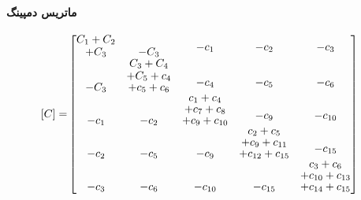 \paragraph{ماتریس دمپینگ}
\begin{equation}\label{Eq.damping_matrix_dimensional_combined}
\begin{aligned}
[C] =& 
\begin{bmatrix}
\shortstack{$C_1 + C_2$ \\ $+ C_3$} & -C_3 & \shortstack{$-c_1$ \\ \,} & \shortstack{$-c_2$ \\ \,} & \shortstack{$-c_3$ \\ \,} \\
-C_3 & \shortstack{$C_3 + C_4$ \\ $+ C_5 + c_4$ \\ $+ c_5 + c_6$} & \shortstack{$-c_4$ \\ \,} & \shortstack{$-c_5$ \\ \,} & \shortstack{$-c_6$ \\ \,} \\
-c_1 & -c_2 & \shortstack{$c_1 + c_4$ \\ $+ c_7 + c_8$ \\ $+ c_9 + c_{10}$} & \shortstack{$-c_9$ \\ \,} & \shortstack{$-c_{10}$ \\ \,} \\
-c_2 & -c_5 & -c_9 & \shortstack{$c_2 + c_5$ \\ $+ c_9 + c_{11}$ \\ $+ c_{12} + c_{15}$} & \shortstack{$-c_{15}$ \\ \,} \\
-c_3 & -c_{6} & -c_{10} & -c_{15} & \shortstack{$c_3 + c_6$ \\ $+ c_{10} + c_{13}$ \\ $+ c_{14} + c_{15}$}
\end{bmatrix}
\end{aligned}
\end{equation}
